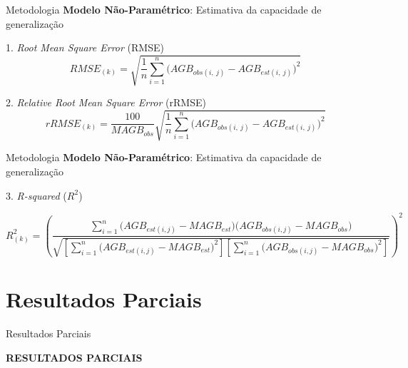 \documentclass[12pt,ignorenonframetext,aspectratio=1610]{beamer}
\begin{document}
\begin{frame}[t]{Metodologia}
	\textbf{Modelo Não-Paramétrico}: Estimativa da capacidade de generalização \newline
	
1. \textit{Root Mean Square Error} (RMSE)
\begin{equation}
RMSE_{(k)} =\sqrt{\frac{1}{n}\displaystyle\sum\limits_{i=1}^n\bigg(AGB_{obs(i,\ j)}-AGB_{est(i,\ j)}\bigg)^2}
\end{equation}

2. \textit{Relative Root Mean Square Error} (rRMSE)
\begin{equation}
rRMSE_{(k)} =\frac{100}{MAGB_{obs}}\sqrt{\frac{1}{n}\displaystyle\sum\limits_{i=1}^n\bigg(AGB_{obs(i,\ j)}-AGB_{est(i,\ j)}\bigg)^2}
\end{equation}

\end{frame}


\begin{frame}[t]{Metodologia}
	\textbf{Modelo Não-Paramétrico}: Estimativa da capacidade de generalização \newline
	
	3. \textit{R-squared} ($R^2$)

	\begin{footnotesize}
		\begin{equation}
	R^2_{(k)} =\left(\frac{\displaystyle\sum\limits_{i=1}^n
			\bigg(AGB_{est(i,j)}-MAGB_{est}\bigg)
			\bigg(AGB_{obs(i,j)}-MAGB_{obs}\bigg)}
		{\sqrt{\left [\displaystyle\sum\limits_{i=1}^n
				\bigg(AGB_{est(i,j)}-MAGB_{est}\bigg)^2 \right]
				\left [\displaystyle\sum\limits_{i=1}^n
				\bigg(AGB_{obs(i,j)}-MAGB_{obs}\bigg)^2 \right]}}\right)^2
		\end{equation}
	\end{footnotesize}
	
\end{frame}

\section{Resultados Parciais}

\begin{frame}[c]{Resultados Parciais}

\begin{center}
{\Large \textbf{RESULTADOS PARCIAIS}}
\end{center}

\end{frame}
\end{document}
